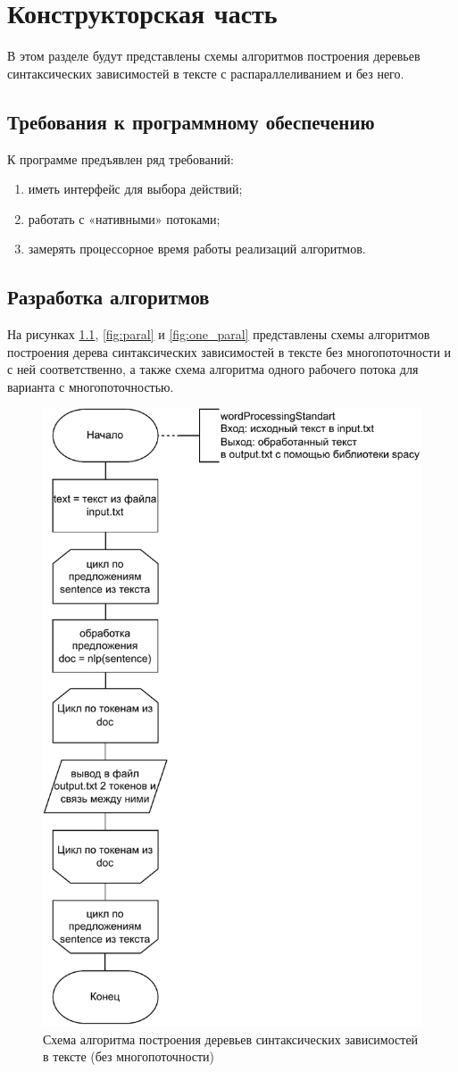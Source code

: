 \chapter{Конструкторская часть}
В этом разделе будут представлены схемы алгоритмов построения деревьев синтаксических зависимостей в тексте с распараллеливанием и без него.

\section{Требования к программному обеспечению}

К программе предъявлен ряд требований:
\begin{enumerate}[label=\arabic*)]
	\item иметь интерфейс для выбора действий;
	\item работать с «нативными» потоками;
	\item замерять процессорное время работы реализаций алгоритмов.
\end{enumerate}

\section{Разработка алгоритмов}

На рисунках \ref{fig:noparal}, \ref{fig:paral} и \ref{fig:one_paral} представлены схемы алгоритмов построения дерева синтаксических зависимостей в тексте без многопоточности и с ней соответственно, а также схема алгоритма одного рабочего потока для варианта с многопоточностью.

\begin{figure}[h!]
	\centering
	\includegraphics[width=0.5\linewidth]{img/no_paral}
	\caption{Схема алгоритма построения деревьев синтаксических зависимостей в тексте (без многопоточности)}
	\label{fig:noparal}
\end{figure}

